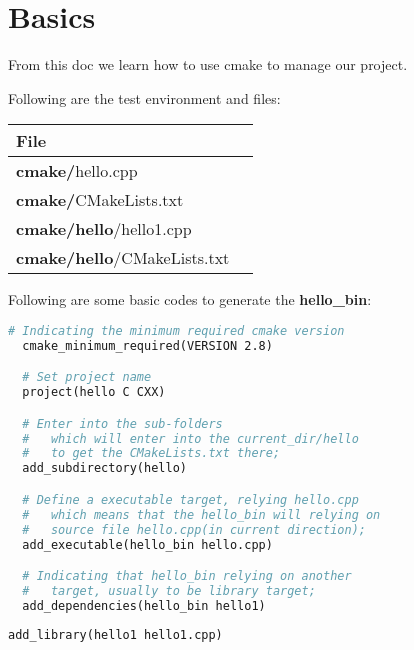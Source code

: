 \documentclass[11pt]{article}
\begin{document}
\maketitle

\Large

\clearpage
\section{Basics}%
\label{sec:basics}

From this doc we learn how to use cmake to manage our project.

\vspace{1cm}

Following are the test environment and files:

\begin{center}
  \begin{tabular}{|l|l|}
    \hline
      \textbf{File} & \textbf{}\\
    \hline
      \textbf{cmake/}hello.cpp &  \\
    \hline
      \textbf{cmake/}CMakeLists.txt &  \\
    \hline
      \textbf{cmake/}\textbf{hello}/hello1.cpp &   \\
    \hline
      \textbf{cmake/}\textbf{hello}/CMakeLists.txt &  \\
    \hline
  \end{tabular}
\end{center}


Following are some basic codes to generate the \textbf{hello\_bin}:
\begin{lstlisting}[language=make,label=lst:1lst,caption=Frame of the \textbf{cmake/CMakeLists.txt}]
  # Indicating the minimum required cmake version
  cmake_minimum_required(VERSION 2.8)

  # Set project name
  project(hello C CXX)

  # Enter into the sub-folders 
  #   which will enter into the current_dir/hello 
  #   to get the CMakeLists.txt there;
  add_subdirectory(hello)

  # Define a executable target, relying hello.cpp
  #   which means that the hello_bin will relying on
  #   source file hello.cpp(in current direction);
  add_executable(hello_bin hello.cpp) 

  # Indicating that hello_bin relying on another 
  #   target, usually to be library target;
  add_dependencies(hello_bin hello1)
\end{lstlisting}

\begin{lstlisting}[language=make,label=lst:2lst,caption=Frame of the \textbf{cmake/hello/CMakeLists.txt}]
add_library(hello1 hello1.cpp)
\end{lstlisting}

\end{document}
